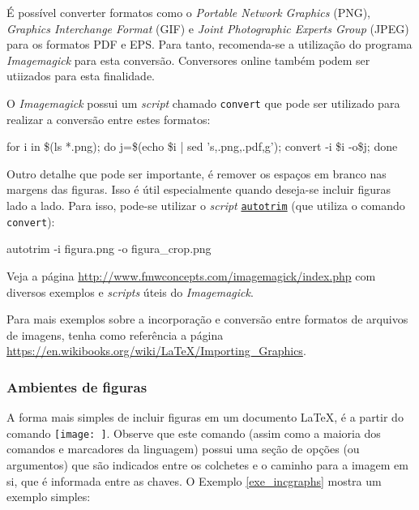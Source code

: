É possível converter formatos como o \textit{Portable Network Graphics} (PNG), \textit{Graphics Interchange Format} (GIF) e \textit{Joint Photographic Experts Group} (JPEG) para os formatos PDF e EPS. Para tanto, recomenda-se a utilização do programa \textit{Imagemagick} para esta conversão. Conversores online também podem ser utiizados para esta finalidade.

O \textit{Imagemagick} possui um \textit{script} chamado {\tt convert} que pode ser utilizado para realizar a conversão entre estes formatos:

\begin{commandshell}
for i in \$(ls *.png); do j=\$(echo \$i | sed 's,.png,.pdf,g'); 
convert -i \$i -o\$j; done
\end{commandshell}

Outro detalhe que pode ser importante, é remover os espaços em branco nas margens das figuras. Isso é útil especialmente quando deseja-se incluir figuras lado a lado. Para isso, pode-se utilizar o \textit{script} \href{http://www.fmwconcepts.com/imagemagick/autotrim/index.php}{{\tt autotrim}} (que utiliza o comando {\tt convert}):

\begin{commandshell}
autotrim -i figura.png -o figura_crop.png
\end{commandshell}

\begin{marker}
Veja a página \url{http://www.fmwconcepts.com/imagemagick/index.php} com diversos exemplos e \textit{scripts} úteis do \textit{Imagemagick}.
\end{marker}

\begin{marker}
  Para mais exemplos sobre a incorporação e conversão entre formatos de arquivos de imagens, tenha como referência a página \url{https://en.wikibooks.org/wiki/LaTeX/Importing_Graphics}.
\end{marker}

\subsubsection*{Ambientes de figuras}
\label{sec:amb_figs}

A forma mais simples de incluir figuras em um documento \LaTeX{}, é a partir do comando \texttt{\texttt{[image: ]}}. Observe que este comando (assim como a maioria dos comandos e marcadores da linguagem) possui uma seção de opções (ou argumentos) que são indicados entre os colchetes e o caminho para a imagem em si, que é informada entre as chaves. O Exemplo \ref{exe_incgraphs} mostra um exemplo simples:

